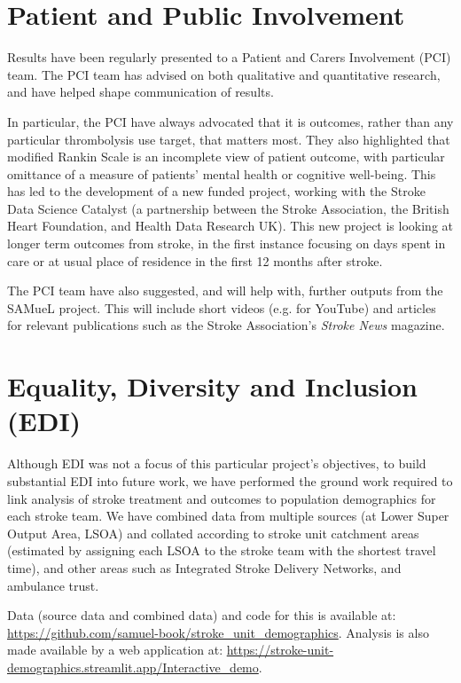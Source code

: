 
\section{Patient and Public Involvement}

Results have been regularly presented to a Patient and Carers Involvement (PCI) team. The PCI team has advised on both qualitative and quantitative research, and have helped shape communication of results.

In particular, the PCI have always advocated that it is outcomes, rather than any particular thrombolysis use target, that matters most. They also highlighted that modified Rankin Scale is an incomplete view of patient outcome, with particular omittance of a measure of patients' mental health or cognitive well-being. This has led to the development of a new funded project, working with the Stroke Data Science Catalyst (a partnership between the Stroke Association, the British Heart Foundation, and Health Data Research UK). This new project is looking at longer term outcomes from stroke, in the first instance focusing on days spent in care or at usual place of residence in the first 12 months after stroke.

The PCI team have also suggested, and will help with, further outputs from the SAMueL project. This will include short videos (e.g. for YouTube) and articles for relevant publications such as the Stroke Association's \textit{Stroke News} magazine.

\section{Equality, Diversity and Inclusion (EDI)}

Although EDI was not a focus of this particular project's objectives, to build substantial EDI into future work, we have performed the ground work required to link analysis of stroke treatment and outcomes to population demographics for each stroke team. We have combined data from multiple sources (at Lower Super Output Area, LSOA) and collated according to stroke unit catchment areas (estimated by assigning each LSOA to the stroke team with the shortest travel time), and other areas such as Integrated Stroke Delivery Networks, and ambulance trust.

Data (source data and combined data) and code for this is available at: \url{https://github.com/samuel-book/stroke_unit_demographics}. Analysis is also made available by a web application at: \url{https://stroke-unit-demographics.streamlit.app/Interactive_demo}.


